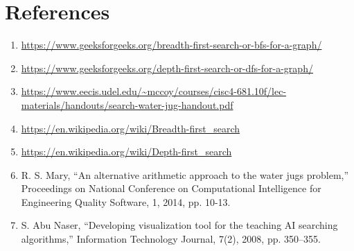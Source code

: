 \documentclass[conference]{IEEEtran}
\begin{document}
 \section{References}
 \begin{enumerate}
\color{blue}
\item \url{https://www.geeksforgeeks.org/breadth-first-search-or-bfs-for-a-graph/} 
\item \url{https://www.geeksforgeeks.org/depth-first-search-or-dfs-for-a-graph/}
\item \url{https://www.eecis.udel.edu/~mccoy/courses/cisc4-681.10f/lec-materials/handouts/search-water-jug-handout.pdf}
\item \url{https://en.wikipedia.org/wiki/Breadth-first_search}
\item \url{https://en.wikipedia.org/wiki/Depth-first_search}
\item R.  S.  Mary,  “An  alternative  arithmetic  approach  to  the  water  jugs problem,”  Proceedings  on National  Conference  on  Computational Intelligence for Engineering Quality Software, 1, 2014, pp. 10-13.
\item S.  Abu  Naser,  “Developing  visualization  tool  for  the  teaching  AI searching algorithms,” Information Technology Journal,  7(2), 2008, pp. 350–355. 
 \end{enumerate}
\color{black}
\
\end{document}
